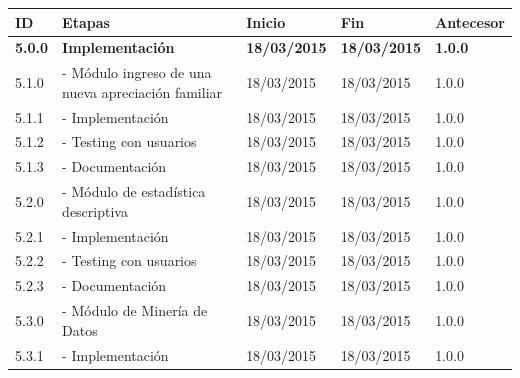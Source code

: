 \documentclass[12pt,letterpaper]{article}
\begin{document}
\begin{table}[htf]
\begin{tabular}{| l | p{6cm} | l | l | l |}
\hline
		
\small{\textbf{ID}} & 
\small{\textbf{Etapas}} & 
\small{\textbf{Inicio}} & 
\small{\textbf{Fin}} & 
\small{\textbf{Antecesor}} \\ \hline

\textbf{\small 5.0.0} & 
\textbf{\small Implementación} & 
\textbf{\small 18/03/2015} &  
\textbf{\small 18/03/2015} & 
\textbf{\small 1.0.0} \\ \hline

\small 5.1.0 & 
\small - Módulo ingreso de una nueva apreciación familiar & 
\small 18/03/2015 &  
\small 18/03/2015 & 
\small 1.0.0 \\ \hline

\small 5.1.1 & 
\small - Implementación & 
\small 18/03/2015 &  
\small 18/03/2015 & 
\small 1.0.0 \\ \hline

\small 5.1.2 & 
\small - Testing con usuarios & 
\small 18/03/2015 &  
\small 18/03/2015 & 
\small 1.0.0 \\ \hline

\small 5.1.3 & 
\small - Documentación & 
\small 18/03/2015 &  
\small 18/03/2015 & 
\small 1.0.0 \\ \hline

\small 5.2.0 &
\small - Módulo de estadística descriptiva & 
\small 18/03/2015 &  
\small 18/03/2015 & 
\small 1.0.0 \\ \hline

\small 5.2.1 & 
\small - Implementación & 
\small 18/03/2015 &  
\small 18/03/2015 & 
\small 1.0.0 \\ \hline

\small 5.2.2 & 
\small - Testing con usuarios & 
\small 18/03/2015 &  
\small 18/03/2015 & 
\small 1.0.0 \\ \hline

\small 5.2.3 & 
\small - Documentación & 
\small 18/03/2015 &  
\small 18/03/2015 & 
\small 1.0.0 \\ \hline

\small 5.3.0 &
\small - Módulo de Minería de Datos & 
\small 18/03/2015 &  
\small 18/03/2015 & 
\small 1.0.0 \\ \hline

\small 5.3.1 & 
\small - Implementación & 
\small 18/03/2015 &  
\small 18/03/2015 & 
\small 1.0.0 \\ \hline


\end{tabular}
\end{table}
\end{document}

